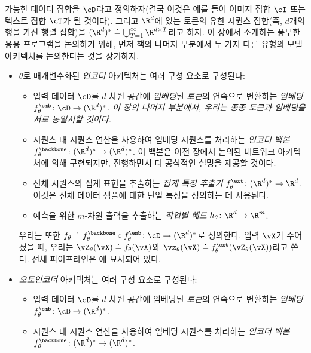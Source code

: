\documentclass[../../book-main_ko.tex]{subfiles}
\begin{document}
가능한 데이터 집합을 \(\cD\)라고 정의하자(결국 이것은 예를 들어 이미지 집합 \(\cI\) 또는 텍스트 집합 \(\cT\)가 될 것이다). 그리고 \(\R^{d}\)에 있는 토큰의 유한 시퀀스 집합(즉, \(d\)개의 행을 가진 행렬 집합)을 \((\R^{d})^{*} \doteq \bigcup_{T = 1}^{\infty}\R^{d \times T}\)라고 하자. 이 장에서 소개하는 풍부한 응용 프로그램을 논의하기 위해, 먼저 책의 나머지 부분에서 두 가지 다른 유형의 모델 아키텍처를 논의한다는 것을 상기하자.
\begin{itemize}
    \item \(\theta\)로 매개변수화된 \textit{인코더} 아키텍처는 여러 구성 요소로 구성된다:
    \begin{itemize}
        \item 입력 데이터 \(\cD\)를 \(d\)-차원 공간에 \textit{임베딩}된 \textit{토큰}의 연속으로 변환하는 \textit{임베딩} \(f_{\theta}^{\emb} \colon \cD \to (\R^{d})^{*}\). \textit{이 장의 나머지 부분에서, 우리는 종종 토큰과 임베딩을 서로 동일시할 것이다.}
        \item 시퀀스 대 시퀀스 연산을 사용하여 임베딩 시퀀스를 처리하는 \textit{인코더 백본} \(f_{\theta}^{\backbone} \colon (\R^{d})^{*} \to (\R^{d})^{*}\). 이 백본은 이전 장에서 논의된 네트워크 아키텍처에 의해 구현되지만, 진행하면서 더 공식적인 설명을 제공할 것이다.
        \item 전체 시퀀스의 집계 표현을 추출하는 \textit{집계 특징 추출기} \(f_{\theta}^{\ext} \colon (\R^{d})^{*} \to \R^{d}\). 이것은 전체 데이터 샘플에 대한 단일 특징을 정의하는 데 사용된다.
        \item 예측을 위한 \(m\)-차원 출력을 추출하는 \textit{작업별 헤드} \(h_{\theta} \colon \R^{d} \to \R^{m}\).
    \end{itemize}
    우리는 또한 \(f_{\theta} \doteq f_{\theta}^{\backbone} \circ f_{\theta}^{\emb} \colon \cD \to (\R^{d})^{*}\)로 정의한다. 입력 \(\vX\)가 주어졌을 때, 우리는 \(\vZ_{\theta}(\vX) \doteq f_{\theta}(\vX)\)와 \(\vz_{\theta}(\vX) \doteq f_{\theta}^{\ext}(\vZ_{\theta}(\vX))\)라고 쓴다. 전체 파이프라인은 에 묘사되어 있다.
    \item \textit{오토인코더} 아키텍처는 여러 구성 요소로 구성된다:
    \begin{itemize}
        \item 입력 데이터 \(\cD\)를 \(d\)-차원 공간에 임베딩된 \textit{토큰}의 연속으로 변환하는 \textit{임베딩} \(f_{\theta}^{\emb} \colon \cD \to (\R^{d})^{*}\).
        \item 시퀀스 대 시퀀스 연산을 사용하여 임베딩 시퀀스를 처리하는 \textit{인코더 백본} \(f_{\theta}^{\backbone} \colon (\R^{d})^{*} \to (\R^{d})^{*}\).

\end{itemize}
\end{itemize}
\end{document}
